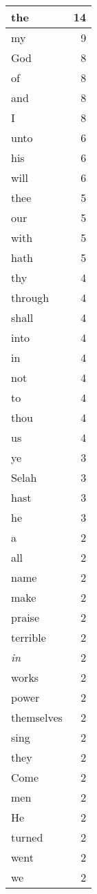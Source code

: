 \begin{center}
\begin{longtable}{l|r}
\hline \hline
\endlastfoot
the & 14 \\ \hline
my & 9 \\ \hline
God & 8 \\ \hline
of & 8 \\ \hline
and & 8 \\ \hline
I & 8 \\ \hline
unto & 6 \\ \hline
his & 6 \\ \hline
will & 6 \\ \hline
thee & 5 \\ \hline
our & 5 \\ \hline
with & 5 \\ \hline
hath & 5 \\ \hline
thy & 4 \\ \hline
through & 4 \\ \hline
shall & 4 \\ \hline
into & 4 \\ \hline
in & 4 \\ \hline
not & 4 \\ \hline
to & 4 \\ \hline
thou & 4 \\ \hline
us & 4 \\ \hline
ye & 3 \\ \hline
Selah & 3 \\ \hline
hast & 3 \\ \hline
he & 3 \\ \hline
a & 2 \\ \hline
all & 2 \\ \hline
name & 2 \\ \hline
make & 2 \\ \hline
praise & 2 \\ \hline
terrible & 2 \\ \hline
\emph{in} & 2 \\ \hline
works & 2 \\ \hline
power & 2 \\ \hline
themselves & 2 \\ \hline
sing & 2 \\ \hline
they & 2 \\ \hline
Come & 2 \\ \hline
men & 2 \\ \hline
He & 2 \\ \hline
turned & 2 \\ \hline
went & 2 \\ \hline
we & 2 \\ \hline

\end{longtable}
\end{center}
